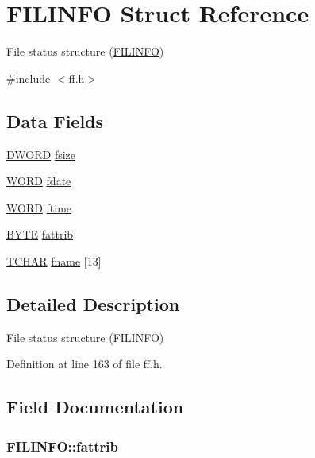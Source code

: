 \hypertarget{structFILINFO}{\section{F\-I\-L\-I\-N\-F\-O Struct Reference}
\label{structFILINFO}
}


File status structure (\hyperlink{structFILINFO}{F\-I\-L\-I\-N\-F\-O})  




{\ttfamily \#include $<$ff.\-h$>$}

\subsection*{Data Fields}
\begin{DoxyCompactItemize}
\item 
\hyperlink{integer_8h_ad342ac907eb044443153a22f964bf0af}{D\-W\-O\-R\-D} \hyperlink{structFILINFO_aee7441af7dc0c443d1e1e6011cc7dcac}{fsize}
\item 
\hyperlink{integer_8h_a197942eefa7db30960ae396d68339b97}{W\-O\-R\-D} \hyperlink{structFILINFO_a7c01c48a15b1b49da459924437b0bd52}{fdate}
\item 
\hyperlink{integer_8h_a197942eefa7db30960ae396d68339b97}{W\-O\-R\-D} \hyperlink{structFILINFO_ae0f751b79621bf7b29669f177bbe6b9a}{ftime}
\item 
\hyperlink{integer_8h_a4ae1dab0fb4b072a66584546209e7d58}{B\-Y\-T\-E} \hyperlink{structFILINFO_a838d542585831b085537b363f18205c0}{fattrib}
\item 
\hyperlink{ff_8h_a03bdb8ce5895c7e261aadc2529637546}{T\-C\-H\-A\-R} \hyperlink{structFILINFO_abd852510f2f79b4ec773156d8942dc7c}{fname} \mbox{[}13\mbox{]}
\end{DoxyCompactItemize}


\subsection{Detailed Description}
File status structure (\hyperlink{structFILINFO}{F\-I\-L\-I\-N\-F\-O}) 

Definition at line 163 of file ff.\-h.



\subsection{Field Documentation}
\hypertarget{structFILINFO_a838d542585831b085537b363f18205c0}{
\subsubsection[{fattrib}]{ F\-I\-L\-I\-N\-F\-O\-::fattrib}}\label{structFILINFO_a838d542585831b085537b363f18205c0}


